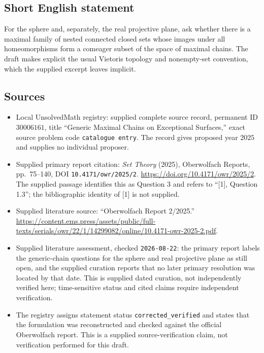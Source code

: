 \documentclass[11pt]{article}
\begin{document}
\subsection{Short English statement}
For the sphere and, separately, the real projective plane, ask whether there is a maximal family of nested connected closed sets whose images under all homeomorphisms form a comeager subset of the space of maximal chains. The draft makes explicit the usual Vietoris topology and nonempty-set convention, which the supplied excerpt leaves implicit.
\subsection{Sources}
\begin{itemize}
\item Local UnsolvedMath registry: supplied complete source record, permanent ID \(30006161\), title ``Generic Maximal Chains on Exceptional Surfaces,'' exact source problem code \texttt{catalogue entry}. The record gives proposed year \(2025\) and supplies no individual proposer.
\item Supplied primary report citation: \emph{Set Theory} (2025), Oberwolfach Reports, pp.\ 75--140, DOI \texttt{10.4171/owr/2025/2}. \url{https://doi.org/10.4171/owr/2025/2}. The supplied passage identifies this as Question 3 and refers to ``[1], Question 1.3''; the bibliographic identity of [1] is not supplied.
\item Supplied literature source: ``Oberwolfach Report 2/2025.'' \url{https://content.ems.press/assets/public/full-texts/serials/owr/22/1/14299082/online/10.4171-owr-2025-2.pdf}.
\item Supplied literature assessment, checked \texttt{2026-08-22}: the primary report labels the generic-chain questions for the sphere and real projective plane as still open, and the supplied curation reports that no later primary resolution was located by that date. This is supplied dated curation, not independently verified here; time-sensitive status and cited claims require independent verification.
\item The registry assigns statement status \texttt{corrected\_verified} and states that the formulation was reconstructed and checked against the official Oberwolfach report. This is a supplied source-verification claim, not verification performed for this draft.
\end{itemize}
\end{document}
